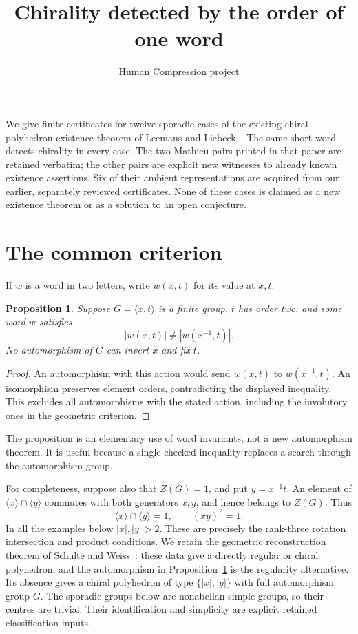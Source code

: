 \documentclass[11pt,a4paper]{article}
\title{Chirality detected by the order of one word}
\author{Human Compression project}\date{}
\newtheorem{proposition}{Proposition}
\begin{document}
\maketitle
We give finite certificates for twelve sporadic cases of the existing
chiral-polyhedron existence theorem of Leemans and Liebeck~\cite{LL}.
The same short word detects chirality in every case. The two Mathieu
pairs printed in that paper are retained verbatim; the other pairs are
explicit new witnesses to already known existence assertions. Six of
their ambient representations are acquired from our earlier, separately
reviewed certificates. None of these cases is claimed as a new
existence theorem or as a solution to an open conjecture.

\section{The common criterion}
If $w$ is a word in two letters, write $w(x,t)$ for its value at $x,t$.
\begin{proposition}\label{word}
Suppose $G=\langle x,t\rangle$ is a finite group, $t$ has order two,
and some word $w$ satisfies
\[
 |w(x,t)|\ne |w(x^{-1},t)|.
\]
No automorphism of $G$ can invert $x$ and fix $t$.
\end{proposition}
\begin{proof}
An automorphism with this action would send $w(x,t)$ to
$w(x^{-1},t)$. An isomorphism preserves element orders, contradicting
the displayed inequality. This excludes all automorphisms with the
stated action, including the involutory ones in the geometric criterion.
\end{proof}
The proposition is an elementary use of word invariants, not a new
automorphism theorem. It is useful because a single checked inequality
replaces a search through the automorphism group.

For completeness, suppose also that $Z(G)=1$, and put $y=x^{-1}t$.
An element of $\langle x\rangle\cap\langle y\rangle$ commutes with
both generators $x,y$, and hence belongs to $Z(G)$. Thus
\[
 \langle x\rangle\cap\langle y\rangle=1,\qquad (xy)^2=1.
\]
In all the examples below $|x|,|y|>2$. These are precisely the rank-three
rotation intersection and product conditions. We retain the geometric
reconstruction theorem of Schulte and Weiss~\cite{SW}: these data give
a directly regular or chiral polyhedron, and the automorphism in
Proposition~\ref{word} is the regularity alternative. Its absence gives
a chiral polyhedron of type $\{|x|,|y|\}$ with full automorphism group
$G$. The sporadic groups below are nonabelian simple groups, so their
centres are trivial. Their identification and simplicity are explicit
retained classification inputs.
\end{document}
